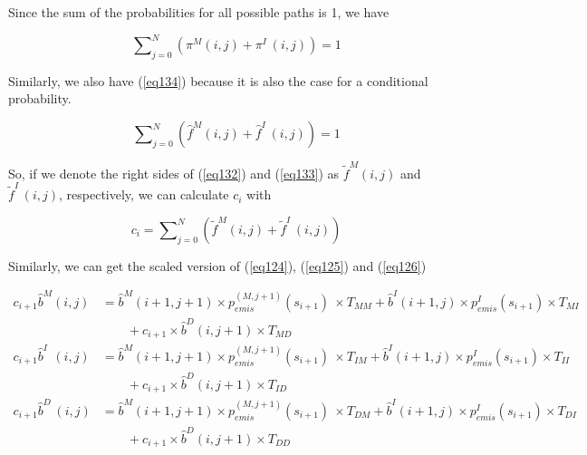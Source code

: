\documentclass[10pt]{article}
\begin{document}
    Since the sum of the probabilities for all possible paths is 1, we have

    \begin{equation}
      \sum\nolimits_{j=0}^{N} \left( \pi^{M}(i, j) + \pi^{I\;}(i, j) \right) = 1
    \end{equation}

    Similarly, we also have (\ref{eq134}) because it is also the case for a conditional probability.

    \begin{equation} \label{eq134}
      \sum\nolimits_{j=0}^{N} \left( \widehat{f}^{M}(i, j) + \widehat{f}^{I\;}(i, j) \right) = 1
    \end{equation}

    So, if we denote the right sides of (\ref{eq132}) and (\ref{eq133}) as $\widetilde{f}^{M}(i, j)$ and $\widetilde{f}^{I\;}(i, j)$, respectively, we can calculate $c_{i}$ with 

    \begin{equation}
      c_{i} = \sum\nolimits_{j=0}^{N} \left( \widetilde{f}^{M}(i, j) + \widetilde{f}^{I\;}(i, j) \right)
    \end{equation}

    Similarly, we can get the scaled version of (\ref{eq124}), (\ref{eq125}) and (\ref{eq126})

    \begin{equation}
    \begin{aligned}
      c_{i+1} \widehat{b}^{M}(i, j) &= \widehat{b}^M(i+1, j+1) \times p_{emis}^{(M, j+1)}(s_{i+1}) \
        \times T_{MM} + \widehat{b}^{I}(i+1, j) \times p_{emis}^{I}(s_{i+1}) \times T_{MI} \\
                 &\qquad+ c_{i+1} \times \widehat{b}^{D}(i, j+1) \times T_{MD} \\
      c_{i+1} \widehat{b}^{I\;\;}(i, j) &= \widehat{b}^M(i+1, j+1) \times p_{emis}^{(M, j+1)}(s_{i+1}) \
        \times T_{IM} + \widehat{b}^{I}(i+1, j) \times p_{emis}^{I}(s_{i+1}) \times T_{II} \\
                  &\qquad+ c_{i+1} \times \widehat{b}^{D}(i, j+1) \times T_{ID} \\
      c_{i+1} \widehat{b}^{D\;}(i, j) &= \widehat{b}^M(i+1, j+1) \times p_{emis}^{(M, j+1)}(s_{i+1}) \
        \times T_{DM} + \widehat{b}^{I}(i+1, j) \times p_{emis}^{I}(s_{i+1}) \times T_{DI} \\
                  &\qquad+ c_{i+1} \times \widehat{b}^{D}(i, j+1) \times T_{DD}
    \end{aligned}
    \end{equation}
\end{document}
